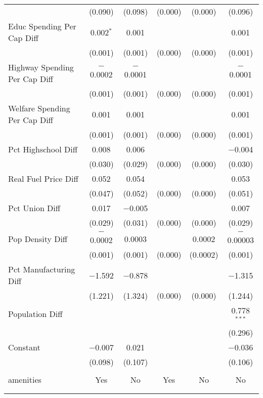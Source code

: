 \begin{table}[!htbp]
\begin{tabular}{@{\extracolsep{5pt}}lccccc}
  & (0.090) & (0.098) & (0.000) & (0.000) & (0.096) \\ 
  Educ Spending Per Cap Diff & 0.002$^{*}$ & 0.001 &  &  & 0.001 \\ 
  & (0.001) & (0.001) & (0.000) & (0.000) & (0.001) \\ 
  Highway Spending Per Cap Diff & $-$0.0002 & $-$0.0001 &  &  & $-$0.0001 \\ 
  & (0.001) & (0.001) & (0.000) & (0.000) & (0.001) \\ 
  Welfare Spending Per Cap Diff & 0.001 & 0.001 &  &  & 0.001 \\ 
  & (0.001) & (0.001) & (0.000) & (0.000) & (0.001) \\ 
  Pct Highschool Diff & 0.008 & 0.006 &  &  & $-$0.004 \\ 
  & (0.030) & (0.029) & (0.000) & (0.000) & (0.030) \\ 
  Real Fuel Price Diff & 0.052 & 0.054 &  &  & 0.053 \\ 
  & (0.047) & (0.052) & (0.000) & (0.000) & (0.051) \\ 
  Pct Union Diff & 0.017 & $-$0.005 &  &  & 0.007 \\ 
  & (0.029) & (0.031) & (0.000) & (0.000) & (0.029) \\ 
  Pop Density Diff & $-$0.0002 & 0.0003 &  & 0.0002 & $-$0.00003 \\ 
  & (0.001) & (0.001) & (0.000) & (0.0002) & (0.001) \\ 
  Pct Manufacturing Diff & $-$1.592 & $-$0.878 &  &  & $-$1.315 \\ 
  & (1.221) & (1.324) & (0.000) & (0.000) & (1.244) \\ 
  Population Diff &  &  &  &  & 0.778$^{***}$ \\ 
  &  &  &  &  & (0.296) \\ 
  Constant & $-$0.007 & 0.021 &  &  & $-$0.036 \\ 
  & (0.098) & (0.107) &  &  & (0.106) \\ 
 \hline \\[-1.8ex] 
amenities & Yes & No & Yes & No & No \\ 
\hline \\[-1.8ex] 
\hline 
\hline \\[-1.8ex] 
\end{tabular} 
\end{table} 
